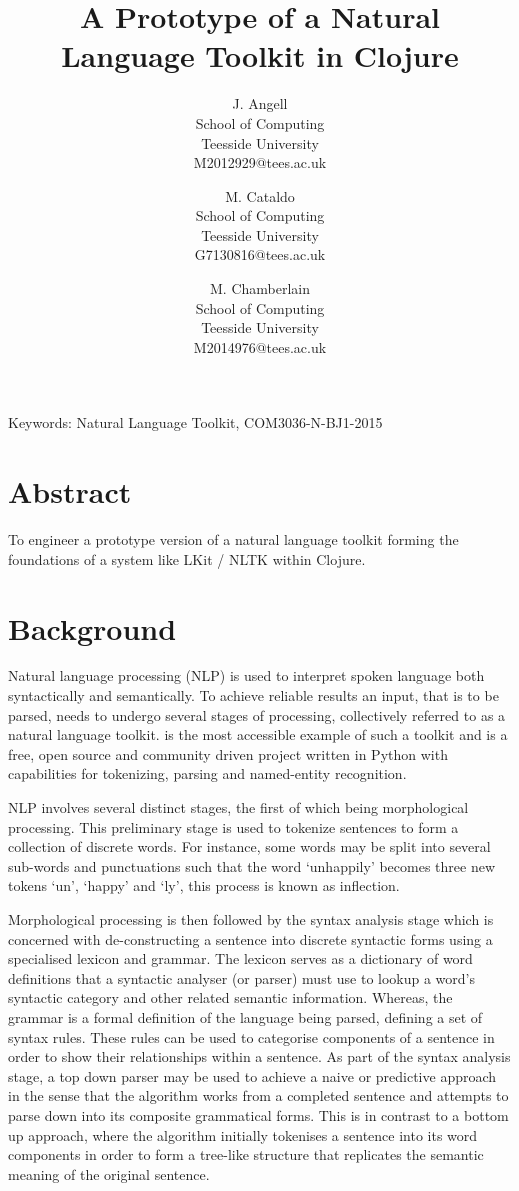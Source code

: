 \documentclass[11pt, a4paper]{article}
\title{A Prototype of a Natural Language Toolkit in Clojure \vspace{.2cm}}
\author{
	J. Angell\vspace{.2cm}\\
	School of Computing\\
	Teesside University\\
	M2012929@tees.ac.uk
	\and
	M. Cataldo\vspace{.2cm}\\
	School of Computing\\
	Teesside University\\
	G7130816@tees.ac.uk
	\and
	M. Chamberlain\vspace{.2cm}\\
	School of Computing\\
	Teesside University\\
	M2014976@tees.ac.uk
}
\date{}
\begin{document}
\maketitle

\noindent
\begin{small}
	Keywords: Natural Language Toolkit, COM3036-N-BJ1-2015
\end{small}

\section*{Abstract}
To engineer a prototype version of a natural language toolkit forming the foundations of a system like LKit \cite{2_lynch_2016} / NLTK within Clojure.

\pagestyle{plain}               %


\section{Background}\label{sec:background}
Natural language processing (NLP) is used to interpret spoken language both syntactically and semantically. To achieve reliable results an input, that is to be parsed, needs to undergo several stages of processing, collectively referred to as a natural language toolkit. \cite{nltk16} is the most accessible example of such a toolkit and is a free, open source and community driven project written in Python with capabilities for tokenizing, parsing and named-entity recognition.

NLP involves several distinct stages, the first of which being morphological processing. This preliminary stage is used to tokenize sentences to form a collection of discrete words. For instance, some words may be split into several sub-words and punctuations such that the word `unhappily' becomes three new tokens `un', `happy' and `ly', this process is known as inflection. \cite{7_manningschutze_1999}

Morphological processing is then followed by the syntax analysis stage which is concerned with de-constructing a sentence into discrete syntactic forms using a specialised lexicon and grammar. The lexicon serves as a dictionary of word definitions that a syntactic analyser (or parser) must use to lookup a word's syntactic category and other related semantic information. Whereas, the grammar is a formal definition of the language being parsed, defining a set of syntax rules. These rules can be used to categorise components of a sentence in order to show their relationships within a sentence. As part of the syntax analysis stage, a top down parser may be used to achieve a naive or predictive approach in the sense that the algorithm works from a completed sentence and attempts to parse down into its composite grammatical forms. This is in contrast to a bottom up approach, where the algorithm initially tokenises a sentence into its word components in order to form a tree-like structure that replicates the semantic meaning of the original sentence.
\end{document}
